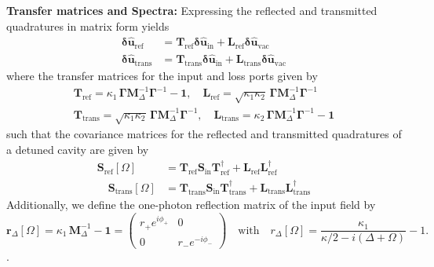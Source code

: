 \noindent \textbf{Transfer matrices and Spectra:} Expressing the reflected and transmitted quadratures in matrix form yields
\begin{equation}
  \begin{split}
   \mathbf{\delta \hat{u}_{\mathrm{ref}}} & = \mathbf{T}_{\mathrm{ref}}\mathbf{\delta \hat{u}_{\mathrm{in}}} + \mathbf{L}_{\mathrm{ref}}  \mathbf{\delta \hat{u}_{\mathrm{vac}}}
    \\
    \mathbf{\delta \hat{u}_{\mathrm{trans}}} & = \mathbf{T}_{\mathrm{trans}}  \mathbf{\delta \hat{u}_{\mathrm{in}}} + \mathbf{L}_{\mathrm{trans}}  \mathbf{\delta \hat{u}_{\mathrm{vac}}}
  \end{split}
\end{equation}
where the transfer matrices for the input and loss ports given by
\begin{equation*}
  \begin{split}
     \mathbf{T}_{\mathrm{ref}}= \kappa_1 \, \mathbf{\Gamma} \mathbf{M}^{-1}_\Delta \mathbf{\Gamma}^{-1}- \mathbf{1}, \quad \mathbf{L}_{\mathrm{ref}}=  \sqrt{\kappa_1 \kappa_2} \, \mathbf{\Gamma}  \mathbf{M}^{-1}_\Delta \mathbf{\Gamma}^{-1}\\
      \mathbf{T}_{\mathrm{trans}}=   \sqrt{\kappa_1 \kappa_2} \, \mathbf{\Gamma}  \mathbf{M}^{-1}_\Delta \mathbf{\Gamma}^{-1}, \quad \mathbf{L}_{\mathrm{trans}}= \kappa_2 \, \mathbf{\Gamma} \mathbf{M}^{-1}_\Delta \mathbf{\Gamma}^{-1}- \mathbf{1}
  \end{split}
\end{equation*}
such that the covariance matrices for the reflected and transmitted quadratures of a detuned cavity are given by
\begin{equation}
  \begin{split}
  \mathbf{S}_{\mathrm{ref}}[\Omega] &= \mathbf{T}_{\mathrm{ref}}\mathbf{S}_{\mathrm{in}} \mathbf{T}_{\mathrm{ref}}^{\dagger}+ \mathbf{L}_{\mathrm{ref}} \mathbf{L}_{\mathrm{ref}}^{\dagger}\\ 
  \quad  \mathbf{S}_{\mathrm{trans}}[\Omega] &= \mathbf{T}_{\mathrm{trans}} \mathbf{S}_{\mathrm{in}} \mathbf{T}_{\mathrm{trans}}^{\dagger} + \mathbf{L}_{\mathrm{trans}}\mathbf{L}_{\mathrm{trans}}^{\dagger}
  \end{split}
\end{equation}
Additionally, we define the one-photon reflection matrix of the input field by 
\begin{equation}
  \mathbf{r}_{\Delta}[\Omega] = \kappa_1 \, \mathbf{M}^{-1}_\Delta- \mathbf{1} = \begin{pmatrix}
    r_+ e^{i \phi_+} & 0 \\
    0 &  r_- e^{-i \phi_-}
  \end{pmatrix} \quad \text{with} \quad r_{\Delta}[\Omega] = \frac{\kappa_1 }{\kappa/2 - i(\Delta + \Omega)} - 1. 
\end{equation}.
